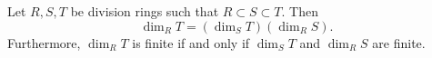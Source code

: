 Let $R,S,T$ be division rings such that $R \subset S \subset T$. Then
\[
\dim_R T = (\dim_S T)(\dim_R S).
\]
Furthermore, $\dim_R T$ is finite if and only if $\dim_S T$ and $\dim_R S$ are finite.
